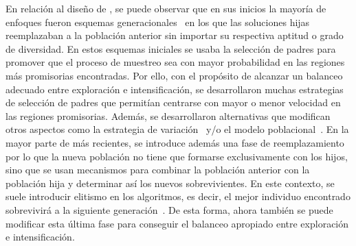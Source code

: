 En relación al diseño de \EAS{}, se puede observar que en sus inicios la mayoría de enfoques fueron esquemas generacionales~\cite{de2006evolutionary} en los 
que las soluciones hijas reemplazaban a la población anterior sin importar su respectiva aptitud o grado de diversidad.
%
En estos esquemas iniciales se usaba la selección de padres para promover que el proceso de muestreo sea con mayor probabilidad en las regiones más promisorias encontradas. 
%
Por ello, con el propósito de alcanzar un balanceo adecuado entre exploración e intensificación, se desarrollaron muchas estrategias de selección de padres
que permitían centrarse con mayor o menor velocidad en las regiones promisorias.
%
Además, se desarrollaron alternativas que modifican otros aspectos como la estrategia de variación~\cite{Joel:herrera2003fuzzy} y/o 
el modelo poblacional~\cite{alba2005parallel}.
%
En la mayor parte de \EAS{} más recientes, se introduce además una fase de reemplazamiento~\cite{eiben2003introduction} por lo que
la nueva población no tiene que formarse exclusivamente con los hijos,
sino que se usan mecanismos para combinar la población anterior con la población hija y determinar así los nuevos sobrevivientes.
%
En este contexto, se suele introducir elitismo en los algoritmos, es decir, el mejor individuo encontrado sobrevivirá a la siguiente generación~\cite{Joel:CHC}.
%
De esta forma, ahora también se puede modificar esta última fase para conseguir el balanceo apropiado entre exploración e intensificación.

